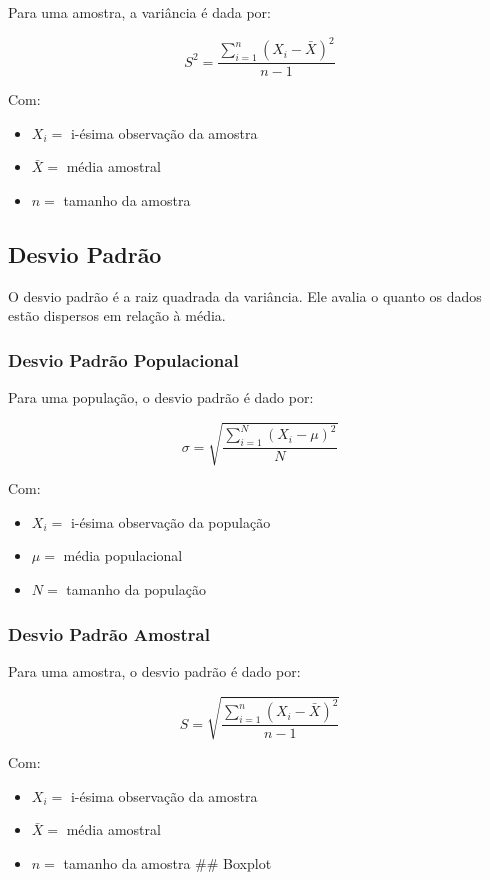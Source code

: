 \documentclass[
]{estat/estat}
\begin{document}
Para uma amostra, a variância é dada por:

\[S^2=\frac{\sum\limits_{i=1}^{n}\left(X_i - \bar{X}\right)^2}{n-1}\]

Com:

\begin{itemize}
\item
  \(X_i =\) i-ésima observação da amostra
\item
  \(\bar{X} =\) média amostral
\item
  \(n =\) tamanho da amostra
\end{itemize}

\subsection{Desvio Padrão}\label{desvio-padruxe3o}

O desvio padrão é a raiz quadrada da variância. Ele avalia o quanto os
dados estão dispersos em relação à média.

\subsubsection{Desvio Padrão
Populacional}\label{desvio-padruxe3o-populacional}

Para uma população, o desvio padrão é dado por:

\[\sigma=\sqrt{\frac{\sum\limits_{i=1}^{N}\left(X_i - \mu\right)^2}{N}}\]

Com:

\begin{itemize}
\item
  \(X_i =\) i-ésima observação da população
\item
  \(\mu =\) média populacional
\item
  \(N =\) tamanho da população
\end{itemize}

\subsubsection{Desvio Padrão Amostral}\label{desvio-padruxe3o-amostral}

Para uma amostra, o desvio padrão é dado por:

\[S=\sqrt{\frac{\sum\limits_{i=1}^{n}\left(X_i - \bar{X}\right)^2}{n-1}}\]

Com:

\begin{itemize}
\item
  \(X_i =\) i-ésima observação da amostra
\item
  \(\bar{X} =\) média amostral
\item
  \(n =\) tamanho da amostra \#\# Boxplot
\end{itemize}
\end{document}
